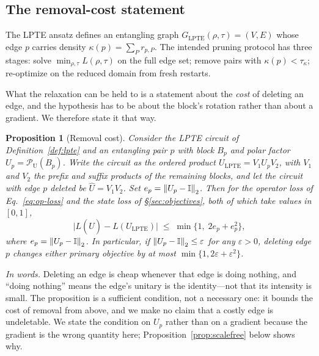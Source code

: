 \documentclass[twocolumn,aps,prl,superscriptaddress,showkeys]{revtex4-2}
\theoremstyle{plain}
\newtheorem{proposition}{Proposition}
\theoremstyle{definition}
\begin{document}
\subsection{The removal-cost statement}

The LPTE ansatz defines an entangling graph $G_{\mathrm{LPTE}}(\rho,\tau)=(V,E)$ whose edge $p$ carries density $\kappa(p)=\sum_P r_{p,P}$. The intended pruning protocol has three stages: solve $\min_{\rho,\tau}L(\rho,\tau)$ on the full edge set; remove pairs with $\kappa(p)<\tau_\kappa$; re-optimize on the reduced domain from fresh restarts.

What the relaxation can be held to is a statement about the \emph{cost} of deleting an edge, and the hypothesis has to be about the block's rotation rather than about a gradient. We therefore state it that way.

\begin{proposition}[Removal cost]
\label{prop:removal-cost}
Consider the LPTE circuit of Definition~\ref{def:lpte} and an entangling pair $p$ with block $B_p$ and polar factor $U_p=\mathcal P_{\mathrm U}(B_p)$. Write the circuit as the ordered product $U_{\mathrm{LPTE}}=V_1U_pV_2$, with $V_1$ and $V_2$ the prefix and suffix products of the remaining blocks, and let the circuit with edge $p$ deleted be $\widehat U=V_1V_2$. Set $e_p=\norm{U_p-\mathbb{I}}_2$. Then for the operator loss of Eq.~\eqref{eq:op-loss} and the state loss of \S\ref{sec:objectives}, both of which take values in $[0,1]$,
$$\bigl|L(\widehat U)-L(U_{\mathrm{LPTE}})\bigr|\;\le\;\min\bigl\{1,\;2e_p+e_p^2\bigr\},$$
where $e_p=\norm{U_p-\mathbb{I}}_2$.
In particular, if $\norm{U_p-\mathbb{I}}_2\le\varepsilon$ for any $\varepsilon>0$, deleting edge $p$ changes either primary objective by at most $\min\{1,2\varepsilon+\varepsilon^2\}$.
\end{proposition}

\noindent\textit{In words.} Deleting an edge is cheap whenever that edge is doing nothing, and ``doing nothing'' means the edge's unitary is the identity---not that its intensity is small. The proposition is a sufficient condition, not a necessary one: it bounds the cost of removal from above, and we make no claim that a costly edge is undeletable. We state the condition on $U_p$ rather than on a gradient because the gradient is the wrong quantity here; Proposition~\ref{prop:scalefree} below shows why.
\end{document}

